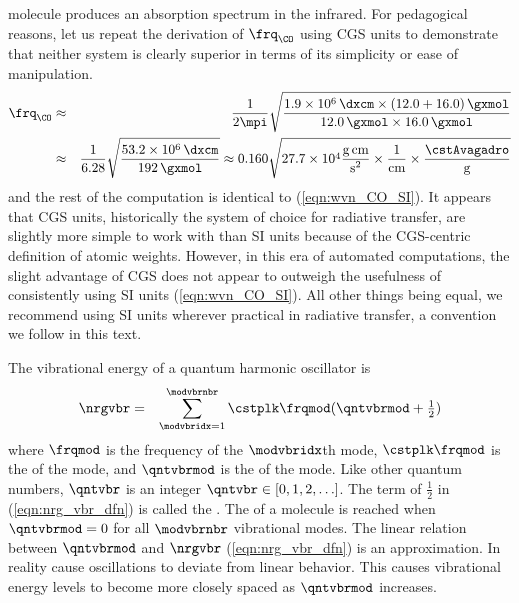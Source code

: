 \documentclass[12pt]{article}
\begin{document}
molecule produces an absorption spectrum in the infrared. 
For pedagogical reasons, let us repeat the derivation of $\frq_{\CO}$
using CGS units to demonstrate that neither system is clearly superior 
in terms of its simplicity or ease of manipulation.
\begin{eqnarray}
\frq_{\CO} & \approx & 
\frac{1}{2\mpi} 
\sqrt{ \frac{ 1.9 \times 10^{6}\,\mbox{\dxcm} \times (12.0 + 16.0)\,\mbox{\gxmol}}
{12.0\,\mbox{\gxmol} \times 16.0\,\mbox{\gxmol} } } \nonumber \\
& \approx & 
\frac{1}{6.28}
\sqrt{ \frac{ 53.2 \times 10^{6}\,\mbox{\dxcm} }
{192\,\mbox{\gxmol} } } \nonumber 
\approx
0.160
\sqrt{ 27.7 \times 10^{4} \frac{\mbox{g\,cm}}{\mbox{s$^{2}$}} \times 
\frac{\mbox{1}}{\mbox{cm}} \times \frac{\cstAvagadro}{\mbox{g}} }
\nonumber
\label{eqn:wvn_CO_CGS}
\end{eqnarray}
and the rest of the computation is identical to (\ref{eqn:wvn_CO_SI}).
It appears that CGS units, historically the system of choice for
radiative transfer, are slightly more simple to work with than SI
units because of the CGS-centric definition of atomic weights.
However, in this era of automated computations, the slight advantage
of CGS does not appear to outweigh the usefulness of consistently
using SI units (\ref{eqn:wvn_CO_SI}).
All other things being equal, we recommend using SI units wherever
practical in radiative transfer, a convention we follow in this text.

The vibrational energy of a quantum harmonic oscillator is
\begin{eqnarray}
\nrgvbr & = & \sum_{\modvbridx=1}^{\modvbrnbr} 
\cstplk \frqmod
(\qntvbrmod + {\textstyle\frac{1}{2}})
\label{eqn:nrg_vbr_dfn}
\end{eqnarray}
where 
$\frqmod$ is the frequency of the $\modvbridx$th mode, 
$\cstplk \frqmod$ is the  of the mode,  
and $\qntvbrmod$ is the  of the
mode. 
Like other quantum numbers, $\qntvbr$ is an integer 
$\qntvbr \in [0, 1, 2, \ldots]$.
The term of $\frac{1}{2}$ in (\ref{eqn:nrg_vbr_dfn}) is called the
.
The  of a molecule is reached when 
$\qntvbrmod = 0$ for all $\modvbrnbr$ vibrational modes.
The linear relation between $\qntvbrmod$ and $\nrgvbr$
(\ref{eqn:nrg_vbr_dfn}) is an approximation.
In reality  cause oscillations to deviate from
linear behavior.
This causes vibrational energy levels to become more closely spaced   
as $\qntvbrmod$ increases.
\end{document}

